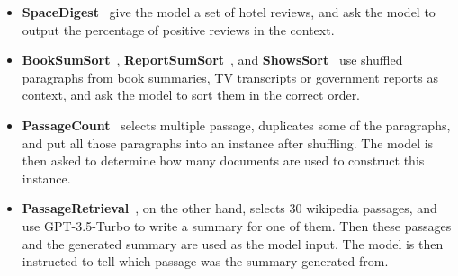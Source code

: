 \begin{itemize}[leftmargin=10pt]
    \item \textbf{SpaceDigest}~\cite{shaham_zeroscrolls:_2023} give the model a set of hotel reviews, and ask the model to output the percentage of positive reviews in the context.
    \item \textbf{BookSumSort}~\cite{shaham_zeroscrolls:_2023}, \textbf{ReportSumSort}~\cite{dong2023bamboo}, and \textbf{ShowsSort}~\cite{dong2023bamboo} use shuffled paragraphs from book summaries, TV transcripts or government reports as context, and ask the model to sort them in the correct order.
    \item \textbf{PassageCount}~\cite{bai_longbench:_2023} selects multiple passage, duplicates some of the paragraphs, and put all those paragraphs into an instance after shuffling. The model is then asked to determine how many documents are used to construct this instance.
    \item \textbf{PassageRetrieval}~\cite{bai_longbench:_2023}, on the other hand, selects 30 wikipedia passages, and use GPT-3.5-Turbo to write a summary for one of them. Then these passages and the generated summary are used as the model input. The model is then instructed to tell which passage was the summary generated from.
\end{itemize}


